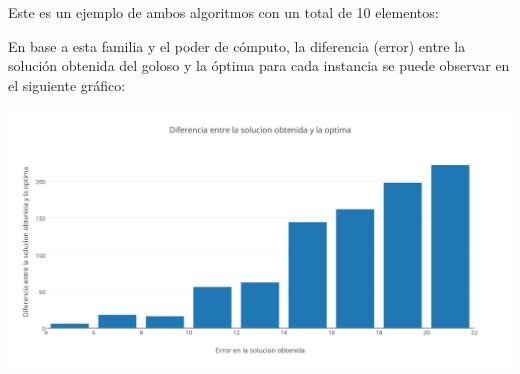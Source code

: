 Este es un ejemplo de ambos algoritmos con un total de 10 elementos:



\begin{figure} [!ht]
 \centering
       \label{fig:fam5exacto}
    \label{fig:fam5goloso}
    \end{figure}



En base a esta familia y el poder de cómputo, la diferencia (error) entre la soluci\'on obtenida del goloso y la \'optima para cada instancia se puede observar en el siguiente gráfico:

\vspace*{0.3cm} \vspace*{0.3cm}
  \begin{center}
\includegraphics[scale=0.5]{./EJ2/algungym0.png}

  \end{center}
  \vspace*{0.3cm}


